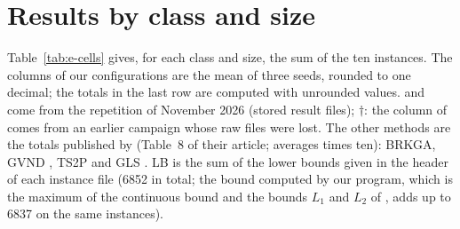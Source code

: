 \providecommand{\todo}[1]{\textcolor{red}{[TODO: #1]}}
\section{Results by class and size}
\label{app:cells}

Table~\ref{tab:e-cells} gives, for each class and size, the sum of the ten instances. The columns of our
configurations are the mean of three seeds, rounded to one decimal; the totals in the last row are computed with unrounded values. \cfgfast{} and \cfgbal{} come from the repetition of November 2026 (stored result files); $\dagger$: the column of \cfgqual{} comes from an earlier campaign whose raw files were lost. The other methods are the
totals published by \citet{Goncalves2013} (Table~8 of their article; averages times ten):
BRKGA, GVND \citep{Parreno2010}, TS2P \citep{Crainic2009} and GLS \citep{Faroe2003}. LB is the sum of the lower bounds given in the header of each instance file (6852 in total;
the bound computed by our program, which is the maximum of the continuous bound and the bounds $L_1$ and $L_2$ of \citet{Martello2000}, adds up to 6837 on the same instances).

